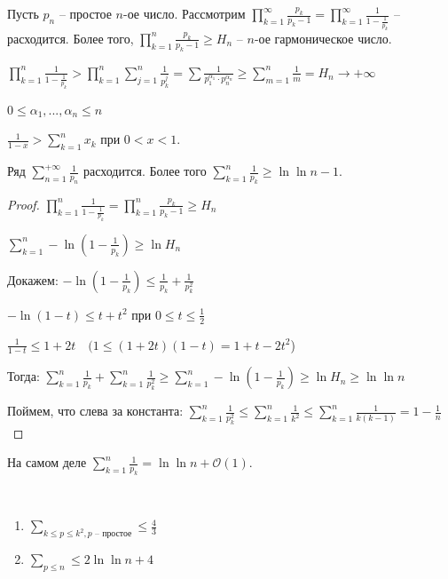 \begin{example}
    Пусть $p_n$ – простое $n$-ое число. Рассмотрим $\prod \limits_{k=1}^\infty \frac{p_k}{p_k-1}=\prod \limits_{k=1}^\infty \frac{1}{1-\frac{1}{p_k}}$ – расходится. Более того, $\prod \limits_{k=1}^n \frac{p_k}{p_k-1}\geq H_n$ – $n$-ое гармоническое число.

    $\prod \limits_{k=1}^n \frac{1}{1-\frac{1}{p_k}}> \prod \limits_{k=1}^n\sum\limits_{j=1}^n\frac{1}{p_k^j}=\sum \frac{1}{p_1^{\alpha_1}\cdot p_n^{\alpha_n}}\geq \sum\limits_{m=1}^n\frac{1}{m}=H_n\rightarrow +\infty$
    
    $0\leq \alpha_1, ..., \alpha_n\leq n$

    $\frac{1}{1-x}> \sum\limits_{k=1}^n x_k$ при $0<x<1$.
\end{example}

\begin{theorem}
    Ряд $\sum\limits_{n=1}^{+\infty}\frac{1}{p_n}$ расходится. Более того $\sum\limits_{k=1}^{n}\frac{1}{p_k}\geq \ln \ln n - 1$.
\end{theorem}

\begin{proof}
    $\prod\limits_{k=1}^n\frac{1}{1-\frac{1}{p_k}}=\prod\limits_{k=1}^n\frac{p_k}{p_k-1}\geq H_n$

    $\sum\limits_{k=1}^n-\ln(1-\frac{1}{p_k})\geq \ln H_n$

    Докажем: $-\ln(1-\frac{1}{p_k})\leq \frac{1}{p_k}+\frac{1}{p_k^2}$

    $-\ln(1-t)\leq t+t^2$ при $0\leq t \leq \frac{1}{2}$

    $\frac{1}{1-t}\leq 1+2t\quad (1\leq (1+2t)(1-t)=1+t-2t^2$)

    Тогда: $\sum \limits_{k=1}^n\frac{1}{p_k} + \sum \limits_{k=1}^n \frac{1}{p_k^2} \geq \sum \limits_{k=1}^n-\ln(1-\frac{1}{p_k})\geq \ln H_n\geq \ln\ln n$

    Поймем, что слева за константа: $\sum \limits_{k=1}^n \frac{1}{p_k^2}\leq \sum \limits_{k=1}^n\frac{1}{k^2}\leq \sum \limits_{k=1}^n\frac{1}{k(k-1)} = 1 - \frac{1}{n}$
\end{proof}

\begin{remark}
    На самом деле $\sum \limits_{k=1}^n \frac{1}{p_k}=\ln\ln n + \mathcal{O}(1)$.
\end{remark}

\begin{exercise}~
    \begin{enumerate}
        \item $\sum\limits_{k\leq p\leq k^2, p\text{ – простое}}\leq \frac{4}{3}$
        \item $\sum\limits_{p\leq n}\leq 2 \ln \ln n + 4$
    \end{enumerate}
\end{exercise}


